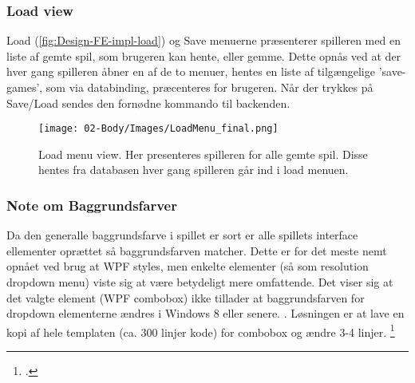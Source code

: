 \subsubsection{Load view}

Load (\autoref{fig:Design-FE-impl-load}) og Save menuerne præsenterer spilleren med en liste af gemte spil, som brugeren kan hente, eller gemme. Dette opnås ved at der hver gang spilleren åbner en af de to menuer, hentes en liste af tilgængelige 'save-games', som via databinding, præcenteres for brugeren. Når der trykkes på Save/Load sendes den fornødne kommando til backenden.

\begin{figure}[h]
\centering
\texttt{[image: 02-Body/Images/LoadMenu\_final.png]}
\caption{Load menu view. Her presenteres spilleren for alle gemte spil. Disse hentes fra databasen hver gang spilleren går ind i load menuen.}
\label{fig:Design-FE-impl-load}
\end{figure}

\subsubsection{Note om Baggrundsfarver}
Da den generalle baggrundsfarve i spillet er sort er alle spillets interface ellementer oprættet så baggrundsfarven matcher. Dette er for det meste nemt opnået ved brug at WPF styles, men enkelte elementer (så som resolution dropdown menu) viste sig at være betydeligt mere omfattende. Det viser sig at det valgte element (WPF combobox) ikke tillader at baggrundsfarven for dropdown elementerne ændres i Windows 8 eller senere. . Løsningen er at lave en kopi af hele templaten (ca. 300 linjer kode) for combobox og ændre 3-4 linjer. \footcite{https://social.technet.microsoft.com/wiki/contents/articles/24240.changing-the-background-color-of-a-combobox-in-wpf-on-windows-8.aspx}

\newpage
